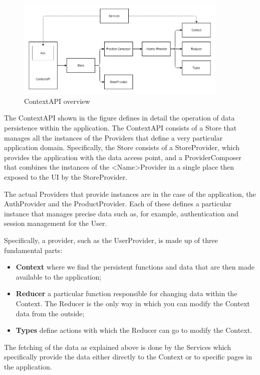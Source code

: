 \begin{figure}[H]
    \centering
    \includegraphics[width=0.9\textwidth]{res/images/frontend-diagrams/ContextAPI.png}
    \caption{ContextAPI overview}
\end{figure}

The ContextAPI shown in the figure defines in detail the operation of data persistence within the application. The ContextAPI consists of a Store that manages all the instances of the Providers that define a very particular application domain. Specifically, the Store consists of a StoreProvider, which provides the application with the data access point, and a ProviderComposer that combines the instances of the <Name>Provider in a single place then exposed to the UI by the StoreProvider.

The actual Providers that provide instances are in the case of the application, the AuthProvider and the ProductProvider. Each of these defines a particular instance that manages precise data such as, for example, authentication and session management for the User.



Specifically, a provider, such as the UserProvider, is made up of three fundamental parts:

\begin{itemize}
    \item \textbf{Context} where we find the persistent functions and data that are then made available to the application;
    \item \textbf{Reducer} a particular function responsible for changing data within the Context. The Reducer is the only way in which you can modify the Context data from the outside; 
    \item \textbf{Types} define actions with which the Reducer can go to modify the Context.
\end{itemize}

The fetching of the data as explained above is done by the Services which specifically provide the data either directly to the Context or to specific pages in the application.

